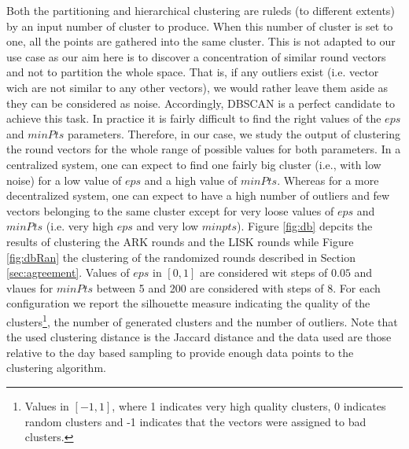 \documentclass{article}
\begin{document}
Both the partitioning and hierarchical clustering are ruleds (to different extents) by an input number of cluster to produce. When this number of cluster is set to one, all the points are gathered into the same cluster. This is not adapted to our use case as our aim here is to discover a concentration of similar round vectors and not to partition the whole space. That is, if any outliers exist (i.e. vector wich are not similar to any other vectors), we would rather leave them aside as they can be considered as noise. Accordingly, DBSCAN is a perfect candidate to achieve this task. In practice it is fairly difficult to find the right values of the $eps$ and $minPts$ parameters. Therefore, in our case, we study the output of clustering the round vectors for the whole range of possible values for both parameters. In a centralized system, one can expect to find one fairly big cluster (i.e., with low noise) for a low value of $eps$ and a high value of $minPts$. Whereas for a more decentralized system, one can expect to have a high number of outliers and few vectors belonging to the same cluster except for very loose values of $eps$ and $minPts$ (i.e. very high $eps$ and very low $minpts$). Figure \ref{fig:db} depcits the results of clustering the ARK rounds and the LISK rounds while Figure \ref{fig:dbRan} the clustering of the randomized rounds described in Section \ref{sec:agreement}. Values of $eps$ in $[0,1]$ are considered wit steps of $0.05$ and vlaues for $minPts$ between 5 and 200 are considered with steps of 8. For each configuration we report the silhouette measure indicating the quality of the clusters\footnote{Values in $[-1,1]$, where 1 indicates very high quality clusters, 0 indicates random clusters and -1 indicates that the vectors were assigned to bad clusters.}\cite{rousseeuw1987silhouettes}, the number of generated clusters and the number of outliers. Note that the used clustering distance is the Jaccard distance \cite{levandowsky1971distance} and the data used are those relative to the day based sampling to provide enough data points to the clustering algorithm.
\end{document}
